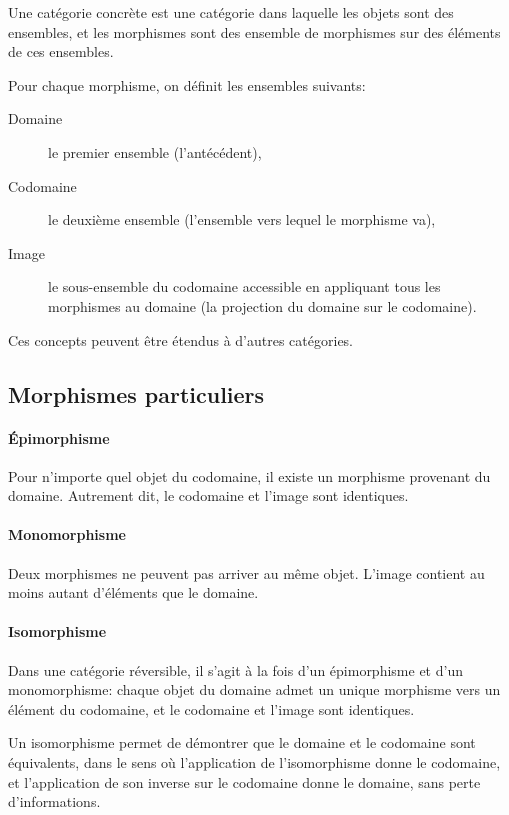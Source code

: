 \documentclass[a4paper,10pt,french,openany]{memoir}
\begin{document}
Une catégorie concrète est une catégorie dans laquelle les objets sont des ensembles, et les morphismes sont des ensemble de morphismes sur des éléments de ces ensembles.

Pour chaque morphisme, on définit les ensembles suivants:
\begin{description}
 \item[Domaine] le premier ensemble (l'antécédent),
 \item[Codomaine] le deuxième ensemble (l'ensemble vers lequel le morphisme va),
 \item[Image] le sous-ensemble du codomaine accessible en appliquant tous les morphismes au domaine (la projection du domaine sur le codomaine).
\end{description}

Ces concepts peuvent être étendus à d'autres catégories.

\subsection{Morphismes particuliers}

\paragraph{Épimorphisme}
Pour n'importe quel objet du codomaine, il existe un morphisme provenant du domaine.
Autrement dit, le codomaine et l'image sont identiques.

\paragraph{Monomorphisme}
Deux morphismes ne peuvent pas arriver au même objet.
L'image contient au moins autant d'éléments que le domaine.

\paragraph{Isomorphisme}
Dans une catégorie réversible, il s'agit à la fois d'un épimorphisme et d'un monomorphisme: chaque objet du domaine admet un unique morphisme vers un élément du codomaine, et le codomaine et l'image sont identiques.

Un isomorphisme permet de démontrer que le domaine et le codomaine sont équivalents, dans le sens où l'application de l'isomorphisme donne le codomaine, et l'application de son inverse sur le codomaine donne le domaine, sans perte d'informations.
\end{document}
